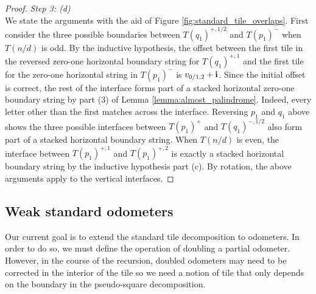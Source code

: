 \documentclass[12pt]{amsart}
\begin{document}
\begin{proof}
	
	{\it Step 3: (d)} \\
	We state the arguments with the aid of Figure \ref{fig:standard_tile_overlaps}.
	First consider the three possible boundaries between $T(q_1)^{+,1/2}$ and $T(p_1)^{-}$ when $T(n/d)$ is odd.
	By the inductive hypothesis, the offset between the first tile in the reversed zero-one horizontal 
	boundary string for $T(q_1)^{+,1}$ and the first tile for the zero-one horizontal string in $T(p_1)^-$ is $v_{0/1,2} + \mathbf{i}$. 
	Since the initial offset is correct, the rest of the interface forms part of a stacked horizontal zero-one boundary string
	by part (3) of Lemma \ref{lemma:almost_palindrome}. Indeed, every letter other than the first matches across the interface. 
	Reversing $p_1$ and $q_1$ above shows the three possible interfaces between $T(p_1)^+$ and $T(q_1)^{-,1/2}$ also form part of a stacked horizontal boundary string.
	When $T(n/d)$ is even, the interface between $T(p_1)^{+,1}$ and $T(p_1)^{+,2}$ is exactly a stacked horizontal 
	boundary string by the inductive hypothesis part (c). By rotation, the above arguments apply to the vertical interfaces. 
\end{proof}

 
\subsection{Weak standard odometers}


Our current goal is to extend the standard tile decomposition to odometers. In order to do so, we must define the operation of doubling a partial odometer. However, in the course of the recursion, doubled odometers may need to be corrected in the interior of the tile
so we need a notion of tile that only depends on the boundary in the pseudo-square decomposition. 
\end{document}
